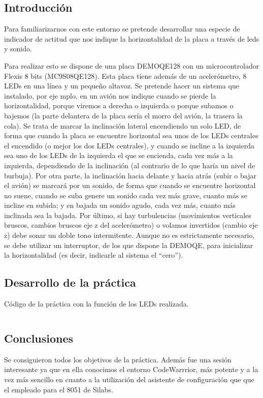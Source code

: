 \documentclass[a4paper, 11pt]{article}
\begin{document}
\subsection{Introducción}
Para familiarizarnos con este entorno se pretende desarrollar una
especie de indicador de actitud que nos indique la horizontalidad
de la placa a través de leds y sonido.

Para realizar esto se dispone de una placa DEMOQE128 con un
microcontrolador Flexis 8 bits (MC9S08QE128). Esta placa tiene
además de un acelerómetro, 8 LEDs en una línea y un pequeño
altavoz.  Se pretende hacer un sistema que instalado, por eje mplo,
en un avión nos indique cuando se pierde la horizontalidad, porque
viremos a derecha o izquierda o porque subamos o bajemos (la parte
delantera de la placa sería el morro del avión, la trasera la
cola). Se trata de marcar la inclinación lateral encendiendo un
solo LED, de forma que cuando la placa se encuentre horizontal sea
unos de los LEDs centrales el encendido (o mejor los dos LEDs
centrales), y cuando se incline a la izquierda sea uno de los LEDs
de la izquierda el que se encienda, cada vez más a la izquierda,
dependiendo de la inclinación (al contrario de lo que haría un
nivel de burbuja). Por otra parte, la inclinación hacia delante y
hacia atrás (subir o bajar el avión) se marcará por un sonido, de
forma que cuando se encuentre horizontal no suene, cuando se suba
genere un sonido cada vez más grave, cuanto más se incline en
subida; y en bajada un sonido agudo, cada vez más, cuanto más
inclinada sea la bajada. Por último, si hay turbulencias
(movimientos verticales bruscos, cambios bruscos eje z del
acelerómetro) o volamos invertidos (cambio eje z) debe sonar un
doble tono intermitente. Aunque no es estrictamente necesario, se
debe utilizar un interruptor, de los que dispone la DEMOQE, para
inicializar la horizontalidad (es decir, indicarle al sistema el
``cero'').

\subsection{Desarrollo de la práctica}
Código de la práctica con la función de los LEDs realizada.
\inputminted[tabsize=4, fontsize=\small]{c}{prac2-main.c}

\subsection{Conclusiones}
Se consiguieron todos los objetivos de la práctica. Además fue una
sesión interesante ya que en ella conocimos el entorno
CodeWarrrior, más potente y a la vez más sencillo en cuanto a la
utilización del asistente de configuración que que el empleado para
el 8051 de Silabs.
\end{document}

